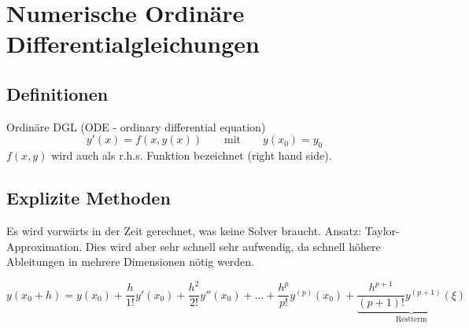 \section{Numerische Ordinäre Differentialgleichungen}

  \subsection{Definitionen}
    Ordinäre DGL (ODE - ordinary differential equation)
    $$\boxed{y'(x) = f(x,y(x)) \qquad\text{mit}\qquad y(x_0) = y_0}$$
    $f(x,y)$ wird auch als r.h.s. Funktion bezeichnet (right hand side).
    
    
      \subsection{Explizite Methoden}
      \label{sec:ode_explicit_methods}
      Es wird vorwärts in der Zeit gerechnet, was keine Solver braucht. Ansatz: Taylor-Approximation.
      Dies wird aber sehr schnell sehr aufwendig, da schnell höhere Ableitungen in mehrere 
      Dimensionen nötig werden.
      
      $$\boxed{y(x_0+h) = y(x_0) + \frac{h}{1!} y'(x_0) + \frac{h^2}{2!}y''(x_0) + \ldots + \frac{h^p}{p!}y^{(p)}(x_0) +\underset{\text{Restterm}}{\underbrace{ \frac{h^{p+1}}{(p+1)!}y^{(p+1)}(\xi)}}}$$
      
